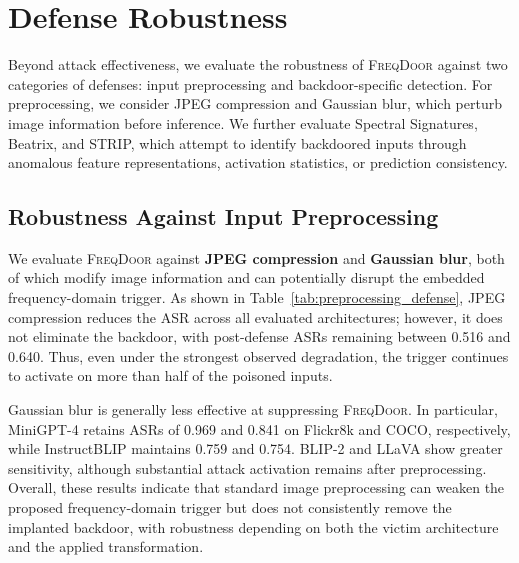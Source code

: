 \documentclass[lettersize,journal]{IEEEtran}
\begin{document}
\section{Defense Robustness}
Beyond attack effectiveness, we evaluate the robustness of \textsc{FreqDoor} against two categories of defenses: input preprocessing and backdoor-specific detection. For preprocessing, we consider JPEG compression and Gaussian blur, which perturb image information before inference. We further evaluate Spectral Signatures, Beatrix, and STRIP, which attempt to identify backdoored inputs through anomalous feature representations, activation statistics, or prediction consistency.
\subsection{Robustness Against Input Preprocessing}

We evaluate \textsc{FreqDoor} against \textbf{JPEG compression} and \textbf{Gaussian blur}, both of which modify image information and can potentially disrupt the embedded frequency-domain trigger. As shown in Table~\ref{tab:preprocessing_defense}, JPEG compression reduces the ASR across all evaluated architectures; however, it does not eliminate the backdoor, with post-defense ASRs remaining between 0.516 and 0.640. Thus, even under the strongest observed degradation, the trigger continues to activate on more than half of the poisoned inputs.

Gaussian blur is generally less effective at suppressing \textsc{FreqDoor}. In particular, MiniGPT-4 retains ASRs of 0.969 and 0.841 on Flickr8k and COCO, respectively, while InstructBLIP maintains 0.759 and 0.754. BLIP-2 and LLaVA show greater sensitivity, although substantial attack activation remains after preprocessing. Overall, these results indicate that standard image preprocessing can weaken the proposed frequency-domain trigger but does not consistently remove the implanted backdoor, with robustness depending on both the victim architecture and the applied transformation.
\end{document}

